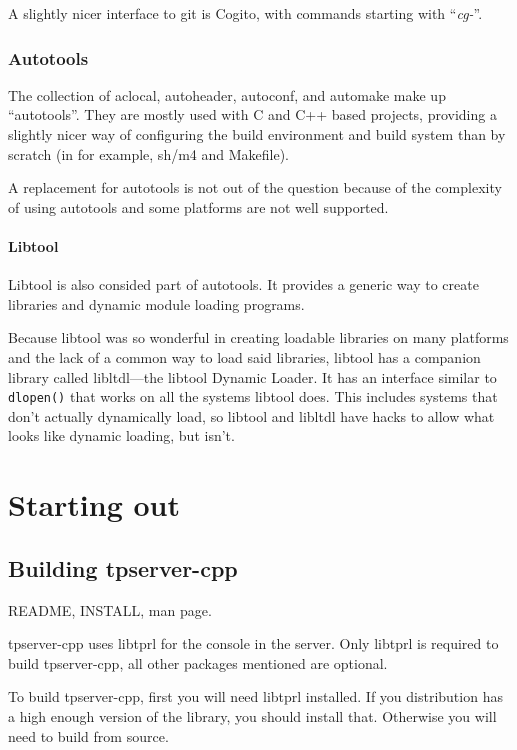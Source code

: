 \documentclass[a4paper,11pt]{report}
\newcommand{\filename}[1]{\emph{#1}}
\newcommand{\codename}[1]{\texttt{#1}}
\begin{document}
A slightly nicer interface to git is Cogito, with commands starting with ``\filename{cg-}''.

\section{Autotools}
\label{sec:autotools}

The collection of aclocal, autoheader, autoconf, and automake make up ``autotools''. They are mostly used with C and C++ based projects, providing a slightly nicer way of configuring the build environment and build system than by scratch (in for example, sh/m4 and Makefile).

A replacement for autotools is not out of the question because of the complexity of using autotools and some platforms are not well supported.

\subsection{Libtool}
\label{sec:libtool}

Libtool is also consided part of autotools. It provides a generic way to create libraries and dynamic module loading programs.

Because libtool was so wonderful in creating loadable libraries on many platforms and the lack of a common way to load said libraries, libtool has a companion library called libltdl---the libtool Dynamic Loader.  It has an interface similar to \codename{dlopen()} that works on all the systems libtool does. This includes systems that don't actually dynamically load, so libtool and libltdl have hacks to allow what looks like dynamic loading, but isn't.


\part{Starting out}
\label{part:starting}

\chapter{Building tpserver-cpp}
\label{chap:building-tpserver-cpp}

README, INSTALL, man page.

tpserver-cpp uses libtprl for the console in the server. Only libtprl is required to build tpserver-cpp, all other packages mentioned are optional.


To build tpserver-cpp, first you will need libtprl installed. If you distribution has a high enough version of the library, you should install that. Otherwise you will need to build from source.
\end{document}
